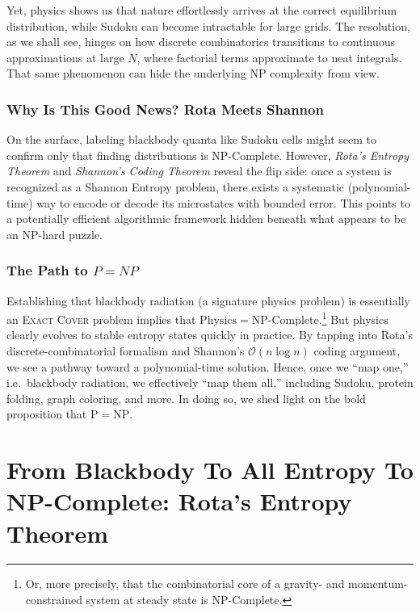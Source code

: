 \documentclass{report}
\begin{document}
Yet, physics shows us that nature effortlessly arrives at the correct equilibrium distribution,
while Sudoku can become intractable for large grids. The resolution, as we shall see, hinges on how
discrete combinatorics transitions to continuous approximations at large \(N\), where factorial 
terms approximate to neat integrals. That same phenomenon can hide the underlying \(\mathrm{NP}\) 
complexity from view.

\subsubsection*{Why Is This Good News? Rota Meets Shannon}
On the surface, labeling blackbody quanta like Sudoku cells might seem to confirm only that 
finding distributions is \(\mathrm{NP}\)-Complete. However, \emph{Rota’s Entropy Theorem} and 
\emph{Shannon’s Coding Theorem} reveal the flip side: once a system is recognized as a Shannon 
Entropy problem, there exists a systematic (polynomial-time) way to encode or decode its microstates
with bounded error. This points to a potentially efficient algorithmic framework hidden beneath 
what appears to be an \(\mathrm{NP}\)-hard puzzle.

\subsubsection*{The Path to \texorpdfstring{$P = NP$}{P=NP}}
Establishing that blackbody radiation (a signature physics problem) is essentially an 
\textsc{Exact Cover} problem implies that \(\mathrm{Physics} = \mathrm{NP}\)-Complete.\footnote{Or,
more precisely, that the combinatorial core of a gravity- and momentum-constrained system at 
steady state is \(\mathrm{NP}\)-Complete.} But physics clearly evolves to stable entropy states 
quickly in practice. By tapping into Rota’s discrete-combinatorial formalism and Shannon’s 
\(\mathcal{O}(n \log n)\) coding argument, we see a pathway toward a polynomial-time solution. 
Hence, once we ``map one,” i.e.\ blackbody radiation, we effectively ``map them all,” including 
Sudoku, protein folding, graph coloring, and more. In doing so, we shed light on the bold 
proposition that \(\mathrm{P} = \mathrm{NP}\).


\section*{From Blackbody To All Entropy To NP-Complete: Rota's Entropy Theorem}
\end{document}

